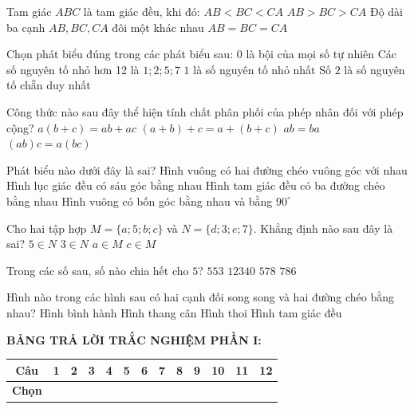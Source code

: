 \documentclass[12pt,a4paper]{article}
\begin{document}
\begin{ex}
Tam giác $ABC$ là tam giác đều, khi đó:
\choice
{$AB < BC < CA$}
{$AB > BC > CA$}
{Độ dài ba cạnh $AB, BC, CA$ đôi một khác nhau}
{\True $AB = BC = CA$}
\end{ex}

\begin{ex}
Chọn phát biểu đúng trong các phát biểu sau:
\choice
{$0$ là bội của mọi số tự nhiên}
{Các số nguyên tố nhỏ hơn 12 là $1; 2; 5; 7$}
{$1$ là số nguyên tố nhỏ nhất}
{\True Số $2$ là số nguyên tố chẵn duy nhất}
\end{ex}

\begin{ex}
Công thức nào sau đây thể hiện tính chất phân phối của phép nhân đối với phép cộng?
\choice
{\True $a(b + c) = ab + ac$}
{$(a + b) + c = a + (b + c)$}
{$ab = ba$}
{$(ab)c = a(bc)$}
\end{ex}

\begin{ex}
Phát biểu nào dưới đây là sai?
\choice
{Hình vuông có hai đường chéo vuông góc với nhau}
{Hình lục giác đều có sáu góc bằng nhau}
{\True Hình tam giác đều có ba đường chéo bằng nhau}
{Hình vuông có bốn góc bằng nhau và bằng $90^\circ$}
\end{ex}

\begin{ex}
Cho hai tập hợp $M = \{a; 5; b; c\}$ và $N = \{d; 3; e; 7\}$. Khẳng định nào sau đây là sai?
\choice
{\True $5 \in N$}
{$3 \in N$}
{$a \in M$}
{$c \in M$}
\end{ex}

\begin{ex}
Trong các số sau, số nào chia hết cho $5$?
\choice
{$553$}
{\True $12340$}
{$578$}
{$786$}
\end{ex}

\begin{ex}
Hình nào trong các hình sau có hai cạnh đối song song và hai đường chéo bằng nhau?
\choice
{Hình bình hành}
{\True Hình thang cân}
{Hình thoi}
{Hình tam giác đều}
\end{ex}


\vspace{1mm}
\noindent\textbf{BẢNG TRẢ LỜI TRẮC NGHIỆM PHẦN I:}
\begin{center}
\begin{tabular}{|c|c|c|c|c|c|c|c|c|c|c|c|c|}
\hline
\textbf{Câu} & \textbf{1} & \textbf{2} & \textbf{3} & \textbf{4} & \textbf{5} & \textbf{6} & \textbf{7} & \textbf{8} & \textbf{9} & \textbf{10} & \textbf{11} & \textbf{12} \\
\hline
\textbf{Chọn} & \rule{0pt}{0.65cm} & & & & & & & & & & & \\
\hline
\end{tabular}
\end{center}
\vspace{2mm}
\end{document}
